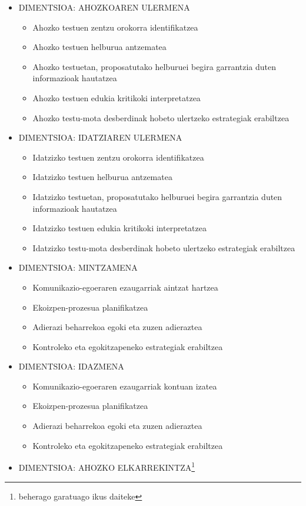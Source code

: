 \documentclass[
]{book}
\providecommand{\tightlist}{%
  \setlength{\itemsep}{0pt}\setlength{\parskip}{0pt}}
\begin{document}
\begin{itemize}
\tightlist
\item
  DIMENTSIOA: AHOZKOAREN ULERMENA

  \begin{itemize}
  \tightlist
  \item
    Ahozko testuen zentzu orokorra identifikatzea
  \item
    Ahozko testuen helburua antzematea
  \item
    Ahozko testuetan, proposatutako helburuei begira garrantzia duten informazioak hautatzea
  \item
    Ahozko testuen edukia kritikoki interpretatzea
  \item
    Ahozko testu-mota desberdinak hobeto ulertzeko estrategiak erabiltzea
  \end{itemize}
\item
  DIMENTSIOA: IDATZIAREN ULERMENA

  \begin{itemize}
  \tightlist
  \item
    Idatzizko testuen zentzu orokorra identifikatzea
  \item
    Idatzizko testuen helburua antzematea
  \item
    Idatzizko testuetan, proposatutako helburuei begira garrantzia duten informazioak hautatzea
  \item
    Idatzizko testuen edukia kritikoki interpretatzea
  \item
    Idatzizko testu-mota desberdinak hobeto ulertzeko estrategiak erabiltzea
  \end{itemize}
\item
  DIMENTSIOA: MINTZAMENA

  \begin{itemize}
  \tightlist
  \item
    Komunikazio-egoeraren ezaugarriak aintzat hartzea
  \item
    Ekoizpen-prozesua planifikatzea
  \item
    Adierazi beharrekoa egoki eta zuzen adieraztea
  \item
    Kontroleko eta egokitzapeneko estrategiak erabiltzea
  \end{itemize}
\item
  DIMENTSIOA: IDAZMENA

  \begin{itemize}
  \tightlist
  \item
    Komunikazio-egoeraren ezaugarriak kontuan izatea
  \item
    Ekoizpen-prozesua planifikatzea
  \item
    Adierazi beharrekoa egoki eta zuzen adieraztea
  \item
    Kontroleko eta egokitzapeneko estrategiak erabiltzea
  \end{itemize}
\item
  DIMENTSIOA: AHOZKO ELKARREKINTZA\footnote{beherago garatuago ikus daiteke}


\end{itemize}
\end{document}
